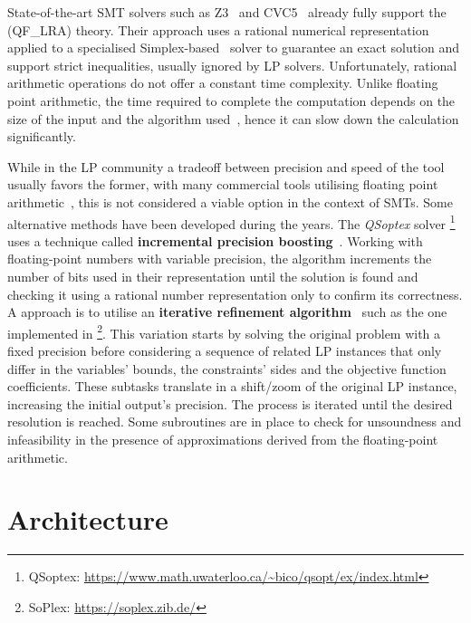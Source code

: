 \documentclass[runningheads]{llncs}
\begin{document}
State-of-the-art SMT solvers such as Z3~\cite{ref:z3} and CVC5~\cite{ref:cvc5} already fully support the (QF\_LRA) theory.
Their approach uses a rational numerical representation applied to a specialised Simplex-based~\cite{ref:simplex} solver to guarantee an exact solution and support strict inequalities, usually ignored by LP solvers.
Unfortunately, rational arithmetic operations do not offer a constant time complexity. %
Unlike floating point arithmetic, the time required to complete the computation depends on the size of the input and the algorithm used~\cite{ref:fft-mult}, hence it can slow down the calculation significantly.

While in the LP community a tradeoff between precision and speed of the tool usually favors the former, with many commercial tools utilising floating point arithmetic~\cite{ref:gurobi}, this is not considered a viable option in the context of SMTs.
Some alternative methods have been developed during the years.
The \textit{QSoptex} solver \footnote{QSoptex: \url{https://www.math.uwaterloo.ca/~bico/qsopt/ex/index.html}} uses a technique called \textbf{incremental precision boosting}~\cite{ref:precision-boosting}.
Working with floating-point numbers with variable precision, the algorithm increments the number of bits used in their representation until the solution is found and checking it using a rational number representation only to confirm its correctness.
A approach is to utilise an \textbf{iterative refinement algorithm}~\cite{ref:iterative-refinement} such as the one implemented in \soplex \footnote{SoPlex: \url{https://soplex.zib.de/}}.
This variation starts by solving the original problem with a fixed precision before considering a sequence of related LP instances that only differ in the variables' bounds, the constraints' sides and the objective function coefficients.
These subtasks translate in a shift/zoom of the original LP instance, increasing the initial output's precision.
The process is iterated until the desired resolution is reached.
Some subroutines are in place to check for unsoundness and infeasibility in the presence of approximations derived from the floating-point arithmetic.

\section{Architecture}
\end{document}
